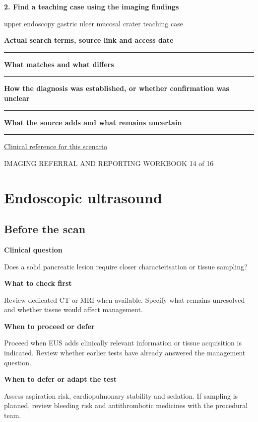 \documentclass[11pt,a4paper]{article}
\newcommand{\record}[1]{\textbf{#1}\par\vspace{0.55\baselineskip}\hrule\vspace{0.35\baselineskip}}
\begin{document}
\textbf{2. Find a teaching case using the imaging findings}\par upper endoscopy gastric ulcer mucosal crater teaching case\par

\record{Actual search terms, source link and access date}

\record{What matches and what differs}

\record{How the diagnosis was established, or whether confirmation was unclear}

\record{What the source adds and what remains uncertain}

\small\href{https://gi.org/guideline/management-of-dyspepsia}{Clinical reference for this scenario}

\normalsize

\newpage

{\small IMAGING REFERRAL AND REPORTING WORKBOOK \hfill 14 of 16}

\section*{Endoscopic ultrasound}

\subsection*{Before the scan}

\textbf{Clinical question}\par Does a solid pancreatic lesion require closer characterisation or tissue sampling?\par

\textbf{What to check first}\par Review dedicated CT or MRI when available. Specify what remains unresolved and whether tissue would affect management.\par

\textbf{When to proceed or defer}\par Proceed when EUS adds clinically relevant information or tissue acquisition is indicated. Review whether earlier tests have already answered the management question.\par

\textbf{When to defer or adapt the test}\par Assess aspiration risk, cardiopulmonary stability and sedation. If sampling is planned, review bleeding risk and antithrombotic medicines with the procedural team.\par
\end{document}
